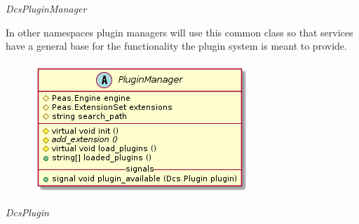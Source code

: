       \emph{DcsPluginManager}

      \vspace*{-0.75cm}
      \begin{minipage}[t]{0.5\textwidth}
        \vspace*{0.5cm}
        In other namespaces plugin managers will use this common class so that
        services have a general base for the functionality the plugin system is
        meant to provide.
      \end{minipage} \hfill
      \begin{minipage}[t]{0.45\textwidth}
        \begin{figure}[H]
          \includegraphics[width=\textwidth]{figures/design/class/core/plugin-manager}
          \label{fig:dsg-classes-plugin-manager}
        \end{figure}
      \end{minipage}

      \emph{DcsPlugin}

